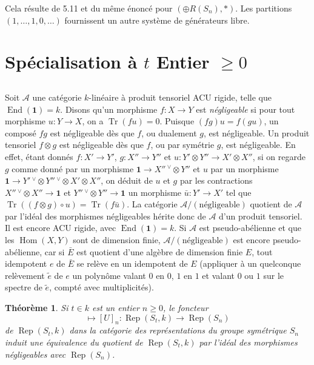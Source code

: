 \documentclass[11pt,a4paper]{article}
\theoremstyle{plain}
\newtheorem{theorem}{Th\'eor\`eme}[section]
\theoremstyle{definition}
\DeclareMathOperator{\Hom}{Hom}
\DeclareMathOperator{\End}{End}
\DeclareMathOperator{\Tr}{Tr}
\DeclareMathOperator{\Rep}{Rep}
\begin{document}
Cela r\'esulte de 5.11 et du m\^eme \'enonc\'e pour $(\oplus R(S_n), \ast)$. Les partitions $(1, \ldots, 1, 0, \ldots)$ fournissent un autre syst\`eme de g\'en\'erateurs libre.


\section{Sp\'ecialisation \`a $t$ Entier $\geq 0$}

\subsection{}
Soit $\mathcal{A}$ une cat\'egorie $k$-lin\'eaire \`a produit tensoriel ACU rigide, telle que $\End(\mathbf{1}) = k$. Disons qu'un morphisme $f : X \to Y$ est \emph{n\'egligeable} si pour tout morphisme $u : Y \to X$, on a $\Tr(fu) = 0$. Puisque $(fg)u = f(gu)$, un compos\'e $fg$ est n\'egligeable d\`es que $f$, ou dualement $g$, est n\'egligeable. Un produit tensoriel $f \otimes g$ est n\'egligeable d\`es que $f$, ou par sym\'etrie $g$, est n\'egligeable. En effet, \'etant donn\'es $f : X' \to Y'$, $g : X'' \to Y''$ et $u : Y' \otimes Y'' \to X' \otimes X''$, si on regarde $g$ comme donn\'e par un morphisme $\mathbf{1} \to X''\!\,^\vee \otimes Y''$ et $u$ par un morphisme $\mathbf{1} \to Y'\!\,^\vee \otimes Y''\!\,^\vee \otimes X' \otimes X''$, on d\'eduit de $u$ et $g$ par les contractions $X''\!\,^\vee \otimes X'' \to \mathbf{1}$ et $Y''\!\,^\vee \otimes Y'' \to \mathbf{1}$ un morphisme $\bar{u} : Y' \to X'$ tel que $\Tr((f \otimes g) \circ u) = \Tr(f\bar{u})$. La cat\'egorie $\mathcal{A}/(\text{n\'egligeable})$ quotient de $\mathcal{A}$ par l'id\'eal des morphismes n\'egligeables h\'erite donc de $\mathcal{A}$ d'un produit tensoriel. Il est encore ACU rigide, avec $\End(\mathbf{1}) = k$. Si $\mathcal{A}$ est pseudo-ab\'elienne et que les $\Hom(X, Y)$ sont de dimension finie, $\mathcal{A}/(\text{n\'egligeable})$ est encore pseudo-ab\'elienne, car si $\bar{E}$ est quotient d'une alg\`ebre de dimension finie $E$, tout idempotent $e$ de $\bar{E}$ se rel\`eve en un idempotent de $E$ (appliquer \`a un quelconque rel\`evement $\tilde{e}$ de $e$ un polyn\^ome valant $0$ en $0$, $1$ en $1$ et valant $0$ ou $1$ sur le spectre de $\tilde{e}$, compt\'e avec multiplicit\'es).

\begin{theorem}
Si $t \in k$ est un entier $n \geq 0$, le foncteur
\begin{equation}
[U] \mapsto [U]_n : \Rep(S_t, k) \to \Rep(S_n) \tag{6.2.1}
\end{equation}
de $\Rep(S_t, k)$ dans la cat\'egorie des repr\'esentations du groupe sym\'etrique $S_n$ induit une \'equivalence du quotient de $\Rep(S_t, k)$ par l'id\'eal des morphismes n\'egligeables avec $\Rep(S_n)$.
\end{theorem}
\end{document}
